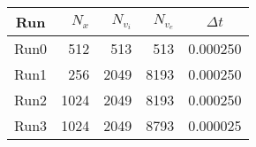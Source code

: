 \begin{table}[H]
	\centering
	\begin{tabular}{|c|r|r|r|c|} \hline
	Run & $N_x$ & $N_{v_i}$ & $N_{v_e}$ & $\Delta t$ \\ 
	\hline \hline 
	Run0 & 512 & 513 & 513 & 0.000250 \\ \hline 
	Run1 & 256 & 2049 & 8193 & 0.000250 \\ \hline 
	Run2 & 1024 & 2049 & 8193 & 0.000250 \\ \hline 
	Run3 & 1024 & 2049 & 8793 & 0.000025 \\ \hline 
	\end{tabular}
	\label{tab:runs}
\end{table}
